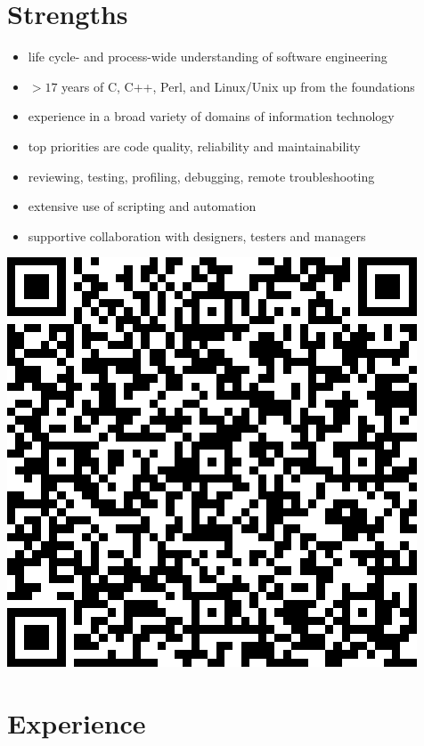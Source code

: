 \documentclass[a4paper,12pt]{article}
\newcommand{\compress}{\setlength\itemsep{-\parskip}}
\newenvironment{compressedItemize}{\begin{itemize}\compress}{\end{itemize}}
\begin{document}
\section{Strengths}

\begin{minipage}[b]{0.82\textwidth}
\begin{compressedItemize}
\item	life cycle- and process-wide understanding of software engineering
\item	$>17$ years of C, C++, Perl, and Linux/Unix up from the foundations
\item	experience in a broad variety of domains of information technology
\item	top priorities are code quality, reliability and maintainability
\item	reviewing, testing, profiling, debugging, remote troubleshooting
\item	extensive use of scripting and automation
\item	supportive collaboration with designers, testers and managers
\end{compressedItemize}
\end{minipage}
\parbox[t]{0.18\textwidth}{\includegraphics[scale=0.28,clip=false]{qrcode}}

\section{Experience}
\end{document}
